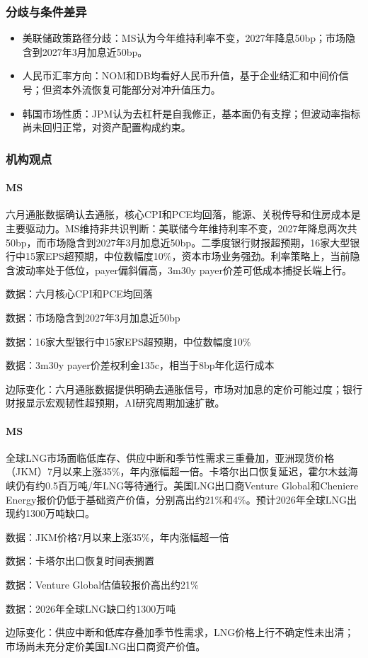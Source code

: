 \documentclass[11pt]{ctexart}
\begin{document}
\subsubsection*{分歧与条件差异}
\begin{itemize}
  \item 美联储政策路径分歧：MS认为今年维持利率不变，2027年降息50bp；市场隐含到2027年3月加息近50bp。
  \item 人民币汇率方向：NOM和DB均看好人民币升值，基于企业结汇和中间价信号；但资本外流恢复可能部分对冲升值压力。
  \item 韩国市场性质：JPM认为去杠杆是自我修正，基本面仍有支撑；但波动率指标尚未回归正常，对资产配置构成约束。
\end{itemize}
\subsubsection*{机构观点}
\paragraph{MS} 六月通胀数据确认去通胀，核心CPI和PCE均回落，能源、关税传导和住房成本是主要驱动力。MS维持非共识判断：美联储今年维持利率不变，2027年降息两次共50bp，而市场隐含到2027年3月加息近50bp。二季度银行财报超预期，16家大型银行中15家EPS超预期，中位数幅度10\%，资本市场业务强劲。利率策略上，当前隐含波动率处于低位，payer偏斜偏高，3m30y payer价差可低成本捕捉长端上行。
{\small\color{refgray}数据：六月核心CPI和PCE均回落\par}
{\small\color{refgray}数据：市场隐含到2027年3月加息近50bp\par}
{\small\color{refgray}数据：16家大型银行中15家EPS超预期，中位数幅度10\%\par}
{\small\color{refgray}数据：3m30y payer价差权利金135c，相当于8bp年化运行成本\par}
{\small\color{refgray}边际变化：六月通胀数据提供明确去通胀信号，市场对加息的定价可能过度；银行财报显示宏观韧性超预期，AI研究周期加速扩散。\par}
\paragraph{MS} 全球LNG市场面临低库存、供应中断和季节性需求三重叠加，亚洲现货价格（JKM）7月以来上涨35\%，年内涨幅超一倍。卡塔尔出口恢复延迟，霍尔木兹海峡仍有约0.5百万吨/年LNG等待通行。美国LNG出口商Venture Global和Cheniere Energy报价仍低于基础资产价值，分别高出约21\%和4\%。预计2026年全球LNG出现约1300万吨缺口。
{\small\color{refgray}数据：JKM价格7月以来上涨35\%，年内涨幅超一倍\par}
{\small\color{refgray}数据：卡塔尔出口恢复时间表搁置\par}
{\small\color{refgray}数据：Venture Global估值较报价高出约21\%\par}
{\small\color{refgray}数据：2026年全球LNG缺口约1300万吨\par}
{\small\color{refgray}边际变化：供应中断和低库存叠加季节性需求，LNG价格上行不确定性未出清；市场尚未充分定价美国LNG出口商资产价值。\par}
\end{document}
